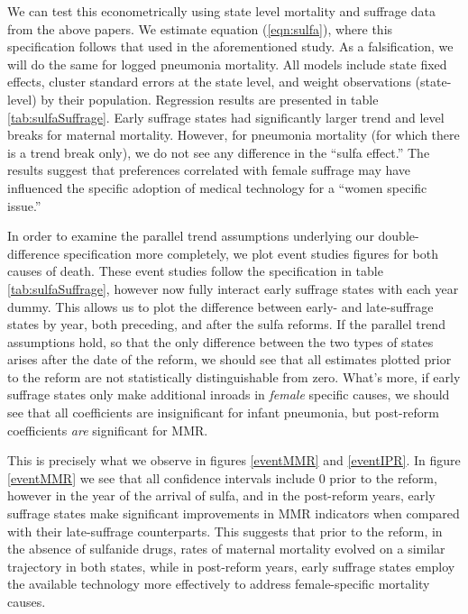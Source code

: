 \documentclass[11pt]{article}
\begin{document}
\begin{spacing}{1.4}
We can test this econometrically using state level mortality and suffrage 
data from the above papers. We estimate equation (\ref{eqn:sulfa}), where this 
specification follows that used in the aforementioned \citet{jayachandran2008mortality} 
study. As a falsification, we will do the same for logged pneumonia mortality. 
All models include state fixed effects, cluster standard errors at the state level, 
and weight observations (state-level) by their population.  Regression results are
presented in table \ref{tab:sulfaSuffrage}.  Early suffrage states had significantly 
larger trend and level breaks for maternal mortality. However, for pneumonia 
mortality (for which there is a trend break only), we do not see any difference in 
the ``sulfa effect.''  The results suggest that preferences correlated with female 
suffrage may have influenced the specific adoption of medical technology for a 
``women specific issue.''


In order to examine the parallel trend assumptions underlying our double-difference 
specification more completely, we plot event studies figures for both causes of 
death.  These event studies follow the specification in table \ref{tab:sulfaSuffrage}, 
however now fully interact early suffrage states with each year dummy.  This allows 
us to plot the difference between early- and late-suffrage states by year, both 
preceding, and after the sulfa reforms.  If the parallel trend assumptions hold, so 
that the only difference between the two types of states arises after the date of the 
reform, we should see that all estimates plotted prior to the reform are not 
statistically distinguishable from zero.  What's more, if early suffrage states only 
make additional inroads in \emph{female} specific causes, we should see that all 
coefficients are insignificant for infant pneumonia, but post-reform coefficients 
\emph{are} significant for MMR.

This is precisely what we observe in figures \ref{eventMMR} and  \ref{eventIPR}.  
In figure \ref{eventMMR} we see that all confidence intervals include 0 prior to the 
reform, however in the year of the arrival of sulfa, and in the post-reform years, 
early suffrage states make significant improvements in MMR indicators when compared 
with their late-suffrage counterparts.  This suggests that prior to the reform, in the 
absence of sulfanide drugs, rates of maternal mortality evolved on a similar 
trajectory in both states, while in post-reform years, early suffrage states employ 
the available technology more effectively to address female-specific mortality causes.


\end{spacing}
\end{document}
